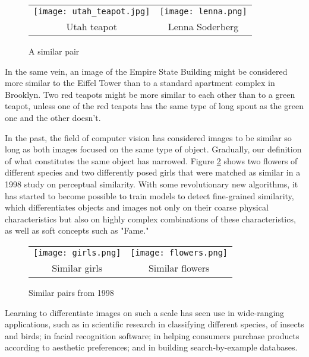\begin{figure}[!htbp]
	\centering
	\begin{tabular}{cc}
		\texttt{[image: utah\_teapot.jpg]} &
		\texttt{[image: lenna.png]}  \\
		Utah teapot & Lenna Soderberg\\[6pt]
	\end{tabular}
	\label{fig:lenna}
	\caption{A similar pair}
\end{figure}

In the same vein, an image of the Empire State Building might be considered more similar to the Eiffel Tower than to a standard apartment complex in Brooklyn. Two red teapots might be more similar to each other than to a green teapot, unless one of the red teapots has the same type of long spout as the green one and the other doesn't.

In the past, the field of computer vision has considered images to be similar so long as both images focused on the same type of object. Gradually, our definition of what constitutes the same object has narrowed. Figure \ref{fig:old_pairs} shows two flowers of different species and two differently posed girls that were matched as similar in a 1998 study on perceptual similarity.\cite{rogowitz1998perceptual} With some revolutionary new algorithms, it has started to become possible to train models to detect fine-grained similarity, which differentiates objects and images not only on their coarse physical characteristics but also on highly complex combinations of these characteristics, as well as soft concepts such as "Fame."

\begin{figure}[!htbp]
	\centering
	\begin{tabular}{cc}
		\texttt{[image: girls.png]} &
		\texttt{[image: flowers.png]}  \\
		Similar girls & Similar flowers \\[6pt]
	\end{tabular}
	\label{fig:old_pairs}
	\caption{Similar pairs from 1998}
\end{figure}

Learning to differentiate images on such a scale has seen use in wide-ranging applications, such as in scientific research in classifying different species, of insects and birds; in facial recognition software; in helping consumers purchase products according to aesthetic preferences; and in building search-by-example databases.\cite{krause2016unreasonable}\cite{chopra2005learning}\cite{bell2015learning}\cite{wang2014learning}

